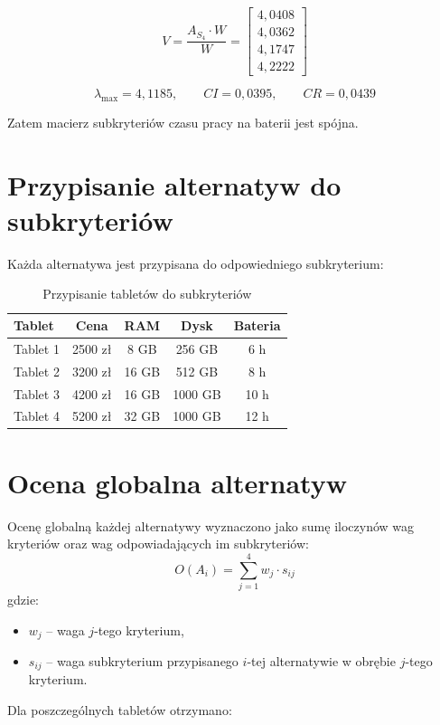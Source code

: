 \documentclass[12pt,a4paper]{article}
\begin{document}
\[
V=
\frac{A_{S_4}\cdot W}{W}
=
\begin{bmatrix}
4{,}0408\\
4{,}0362\\
4{,}1747\\
4{,}2222
\end{bmatrix}
\]

\[
\lambda_{\max}=4{,}1185,\qquad
CI=0{,}0395,\qquad
CR=0{,}0439
\]

Zatem macierz subkryteriów czasu pracy na baterii jest spójna.

\section{Przypisanie alternatyw do subkryteriów}

Każda alternatywa jest przypisana do odpowiedniego subkryterium:

\begin{table}[H]
\centering
\caption{Przypisanie tabletów do subkryteriów}
\begin{tabular}{lcccc}
\toprule
\textbf{Tablet} & \textbf{Cena} & \textbf{RAM} & \textbf{Dysk} & \textbf{Bateria} \\
\midrule
Tablet 1 & 2500 zł & 8 GB & 256 GB & 6 h \\
Tablet 2 & 3200 zł & 16 GB & 512 GB & 8 h \\
Tablet 3 & 4200 zł & 16 GB & 1000 GB & 10 h \\
Tablet 4 & 5200 zł & 32 GB & 1000 GB & 12 h \\
\bottomrule
\end{tabular}
\end{table}

\section{Ocena globalna alternatyw}

Ocenę globalną każdej alternatywy wyznaczono jako sumę iloczynów wag kryteriów oraz wag odpowiadających im subkryteriów:
\[
O(A_i)=\sum_{j=1}^{4} w_j \cdot s_{ij}
\]
gdzie:
\begin{itemize}
    \item \(w_j\) -- waga \(j\)-tego kryterium,
    \item \(s_{ij}\) -- waga subkryterium przypisanego \(i\)-tej alternatywie w obrębie \(j\)-tego kryterium.
\end{itemize}

Dla poszczególnych tabletów otrzymano:
\end{document}
